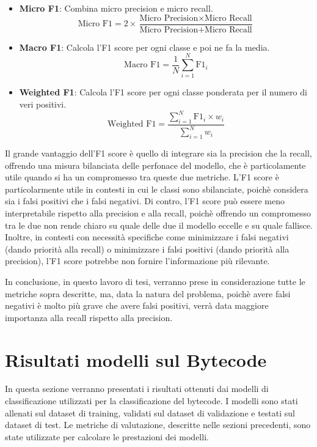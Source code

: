 \documentclass[../../Thesis.tex]{subfiles}
\begin{document}
\begin{itemize}
    \item \textbf{Micro F1}: Combina micro precision e micro recall.
    $$ \text{Micro F1} = 2 \times \frac{\text{Micro Precision} \times \text{Micro Recall}}{\text{Micro Precision} + \text{Micro Recall}} $$
    \item \textbf{Macro F1}: Calcola l'F1 score per ogni classe e poi ne fa la media.
    $$ \text{Macro F1} = \frac{1}{N} \sum_{i=1}^{N} \text{F1}_i $$
    \item \textbf{Weighted F1}: Calcola l'F1 score per ogni classe ponderata per il numero di veri positivi.
    $$ \text{Weighted F1} = \frac{\sum_{i=1}^{N} \text{F1}_i \times w_i}{\sum_{i=1}^{N} w_i} $$
\end{itemize}
Il grande vantaggio dell'F1 score è quello di integrare sia la precision che la recall, offrendo una misura bilanciata delle perfonace del modello, che è particolamente utile quando si ha un compromesso tra queste due metriche. L'F1 score è particolarmente utile in contesti in cui le classi sono sbilanciate, poichè considera sia i falsi positivi che i falsi negativi.
Di contro, l'F1 score può essere meno interpretabile rispetto alla precision e alla recall, poichè offrendo un compromesso tra le due non rende chiaro su quale delle due il modello eccelle e su quale fallisce. Inoltre, in contesti con necessità specifiche come minimizzare i falsi negativi (dando priorità alla recall) o minimizzare i falsi positivi (dando priorità alla precision), l'F1 score potrebbe non fornire l'informazione più rilevante.

In conclusione, in questo lavoro di tesi, verranno prese in considerazione tutte le metriche sopra descritte, ma, data la natura del problema, poichè avere falsi negativi è molto più grave che avere falsi positivi, verrà data maggiore importanza alla recall rispetto alla precision. 

 
\section{Risultati modelli sul Bytecode}
In questa sezione verranno presentati i risultati ottenuti dai modelli di classificazione utilizzati per la classificazione del bytecode. I modelli sono stati allenati sul dataset di training, validati sul dataset di validazione e testati sul dataset di test. Le metriche di valutazione, descritte nelle sezioni precedenti, sono state utilizzate per calcolare le prestazioni dei modelli.
\end{document}
